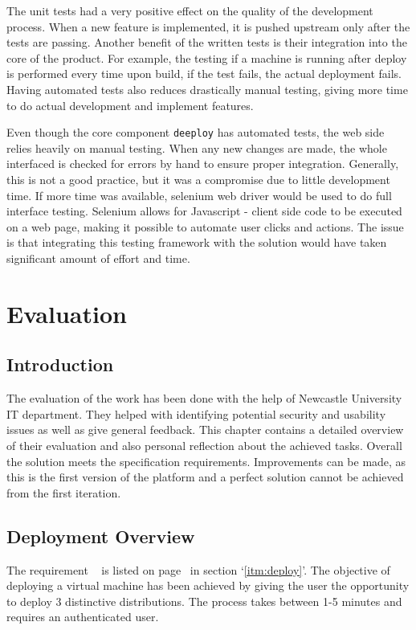 \documentclass{article}
\begin{document}
The unit tests had a very positive effect on the quality of the development process. When a new feature is implemented, it is pushed upstream only after the tests are passing. Another benefit of the written tests is their integration into the core of the product. For example, the testing if a machine is running after deploy is performed every time upon build, if the test fails, the actual deployment fails. Having automated tests also reduces drastically manual testing, giving more time to do actual development and implement features. 

Even though the core component \texttt{deeploy} has automated tests, the web side relies heavily on manual testing. When any new changes are made, the whole interfaced is checked for errors by hand to ensure proper integration. Generally, this is not a good practice, but it was a compromise due to little development time. If more time was available, selenium web driver would be used to do full interface testing. Selenium allows for Javascript - client side code to be executed on a web page, making it possible to automate user clicks and actions. The issue is that integrating this testing framework with the solution would have taken significant amount of effort and time. 

\newpage
\section{Evaluation}

\subsection{Introduction}
The evaluation of the work has been done with the help of Newcastle University \gls{IT} department. They helped with identifying potential security and usability issues as well as give general feedback. This chapter contains a detailed overview of their evaluation and also personal reflection about the achieved tasks. Overall the solution meets the specification requirements. Improvements can be made, as this is the first version of the platform and a perfect solution cannot be achieved from the first iteration.

\subsection{Deployment Overview}
The requirement ~  is listed on page~\pageref{itm:deploy} in section `\ref{itm:deploy}'.
The objective of deploying a virtual machine has been achieved by giving the user the opportunity to deploy 3 distinctive distributions. The process takes between 1-5 minutes and requires an authenticated user.
\end{document}
